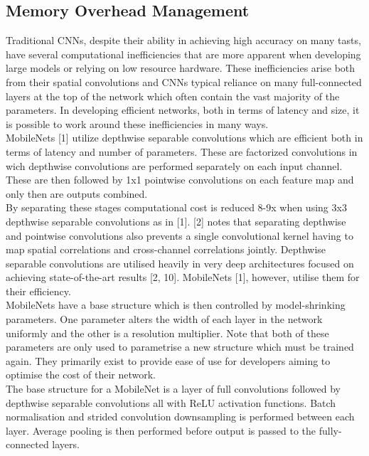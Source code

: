 \documentclass{article}
\begin{document}
\subsection*{Memory Overhead Management}
Traditional CNNs, despite their ability in achieving high accuracy on many tasts, have several computational inefficiencies that are more apparent when developing large models or relying on low resource hardware. These inefficiencies  arise both from their spatial convolutions and CNNs typical reliance on many full-connected layers at the top of the network which often contain the vast majority of the parameters. In developing efficient networks, both in terms of latency and size, it is possible to work around these inefficiencies in many ways.\\

MobileNets [1] utilize depthwise separable convolutions which are efficient both in terms of latency  and number of parameters. These are factorized convolutions in wich depthwise convolutions are performed separately on each input channel. These are then followed by 1x1 pointwise convolutions on each feature map and only then are outputs combined.\\ 

By separating these stages computational cost is reduced 8-9x when using 3x3 depthwise separable convolutions as in [1]. [2] notes that separating depthwise and pointwise convolutions also prevents a single convolutional kernel having to map spatial correlations and cross-channel correlations jointly. Depthwise separable convolutions are utilised heavily in very deep architectures focused on achieving state-of-the-art results [2, 10]. MobileNets [1], however, utilise them for their efficiency. \\

MobileNets have a base structure which is then controlled by model-shrinking parameters. One parameter alters the width of each layer in the network uniformly and the other is a resolution multiplier. Note that both of these parameters are only used to parametrise a new structure which must be trained again. They primarily exist to provide ease of use for developers aiming to optimise the cost of their network.\\

The base structure for a MobileNet is a layer of full convolutions followed by depthwise separable convolutions all with ReLU activation functions. Batch normalisation and strided convolution downsampling is performed between each layer. Average pooling is then performed before output is passed to the fully-connected layers.\\
\end{document}
